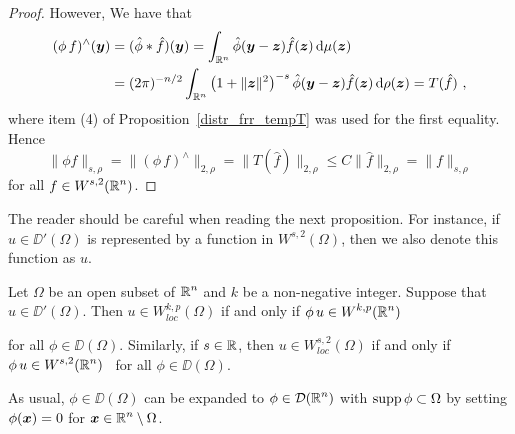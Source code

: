 \begin{proof}
However, We have that 
\begin{align*}
(\phi\,f)^\wedge({\bm{y}}) &= (\hat{\phi}\ast \hat{f})({\bm{y}})
= \int_{\mathbb{R}^n} \hat{\phi}({\bm{y}} - {\bm{z}}) \hat{f}({\bm{z}})
\,\mathrm{d}{\mu({\bm{z}})} \\
&= (2\pi)^{-n/2} \int_{\mathbb{R}^n} \left(1+\|{\bm{z}}\|^2\right)^{-s}
\hat{\phi}({\bm{y}} - {\bm{z}}) \hat{f}({\bm{z}}) \,\mathrm{d}{\rho({\bm{z}})}
= T(\hat{f}) \ ,
\end{align*}
where item (4) of Proposition~\ref{distr_frr_tempT} was used for the
first equality.  Hence
\[
\|\phi f\|_{s,\rho} = \| (\phi\, f)^\wedge\|_{2,\rho}
= \| T(\hat{f}) \|_{2,\rho} \leq C \|\hat{f}\|_{2,\rho}
= \|f \|_{s,\rho}
\]
for all $\displaystyle f \in W^{s,2}(\mathbb{R}^n)$.
\end{proof}

The reader should be careful when reading the next proposition.  For
instance, if $u \in \DD'(\Omega)$ is represented by a function in
$\displaystyle W^{s,2}(\Omega)$, then we also denote this function as
$u$.

\begin{prop} \label{sob_Hsloc_cond}
Let $\Omega$ be an open subset of $\displaystyle \mathbb{R}^n$ and $k$ be a
non-negative integer.  Suppose that $u \in \DD'(\Omega)$.  Then
$\displaystyle u \in W^{k,p}_{loc}(\Omega)$ if and only if
$\displaystyle \phi \, u \in W^{k,p}(\mathbb{R}^n)$
\footnotemark\addtocounter{footnote}{-1}
for all $\phi \in \DD(\Omega)$.
Similarly, if $s \in \mathbb{R}$, then $\displaystyle u \in W^{s,2}_{loc}(\Omega)$
if and only if $\displaystyle \phi \, u \in W^{s,2}(\mathbb{R}^n)$
\footnotemark\ for all $\phi \in \DD(\Omega)$.
\end{prop}

\begin{rmk}
As usual, $\phi \in \DD(\Omega)$ can be expanded to
$\displaystyle \phi \in \mathcal{D}(\mathbb{R}^n)$ with $\operatorname{supp} \phi \subset \Omega$
by setting $\phi({\bm{x}}) = 0$ for
$\displaystyle {\bm{x}} \in \mathbb{R}^n\setminus \Omega$.
\end{rmk}


